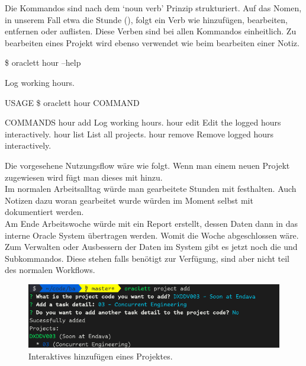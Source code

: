 \documentclass[oneside,bibliography=totocnumbered,BCOR=5mm]{scrbook}
\newenvironment{code}{\captionsetup{type=listing, skip=0pt}}{}
\begin{document}
Die Kommandos sind nach dem `noun verb' Prinzip \parencite{clig} strukturiert.
Auf das Nomen, in unserem Fall etwa die Stunde (), folgt
ein Verb wie hinzufügen, bearbeiten, entfernen oder auflisten. Diese Verben
sind bei allen Kommandos einheitlich. Zu bearbeiten eines Projekt wird ebenso
 verwendet wie beim bearbeiten einer Notiz.

\begin{code}
  \label{code:hours-help}
  \begin{shellcode}
  \$ oraclett hour --help

  Log working hours.

  USAGE
    \$ oraclett hour COMMAND

  COMMANDS
    hour add     Log working hours.
    hour edit    Edit the logged hours interactively.
    hour list    List all projects.
    hour remove  Remove logged hours interactively.
  \end{shellcode}
  \medskip
\end{code}

Die vorgesehene Nutzungsflow wäre wie folgt. Wenn man einem neuen Projekt
zugewiesen wird fügt man dieses  mit  hinzu.
\\
Im normalen Arbeitsalltag würde man gearbeitete Stunden mit  festhalten. Auch Notizen dazu woran gearbeitet wurde würden im Moment
selbst mit  dokumentiert werden.
\\
Am Ende Arbeitswoche würde mit  ein Report erstellt, dessen
Daten dann in das interne Oracle System übertragen werden. Womit die Woche
abgeschlossen wäre.
\\
Zum Verwalten oder Ausbessern der Daten im System gibt es jetzt noch die
 und  Subkommandos. Diese stehen falls
benötigt zur Verfügung, sind aber nicht teil des normalen Workflows.

\begin{figure}
  \centering
  \includegraphics[scale=0.5]{project-add.png}
  \caption{Interaktives hinzufügen eines Projektes.}
  \label{fig:project-add}
\end{figure}
\end{document}
